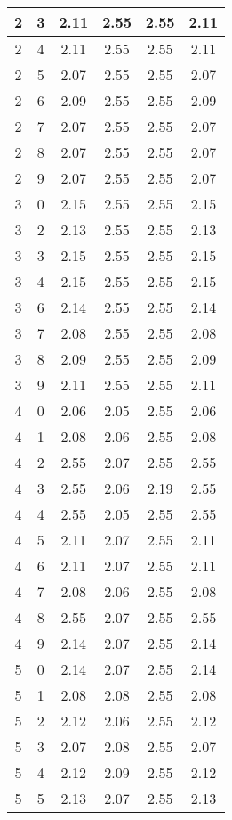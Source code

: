 \begin{longtable}{|c|c||c||c|c||c|}
	2 & 3 & 2.11 & 2.55 & 2.55 & 2.11 \\ \hline
	2 & 4 & 2.11 & 2.55 & 2.55 & 2.11 \\ \hline
	2 & 5 & 2.07 & 2.55 & 2.55 & 2.07 \\ \hline
	2 & 6 & 2.09 & 2.55 & 2.55 & 2.09 \\ \hline
	2 & 7 & 2.07 & 2.55 & 2.55 & 2.07 \\ \hline
	2 & 8 & 2.07 & 2.55 & 2.55 & 2.07 \\ \hline
	2 & 9 & 2.07 & 2.55 & 2.55 & 2.07 \\ \hline
	3 & 0 & 2.15 & 2.55 & 2.55 & 2.15 \\ \hline
	3 & 2 & 2.13 & 2.55 & 2.55 & 2.13 \\ \hline
	3 & 3 & 2.15 & 2.55 & 2.55 & 2.15 \\ \hline
	3 & 4 & 2.15 & 2.55 & 2.55 & 2.15 \\ \hline
	3 & 6 & 2.14 & 2.55 & 2.55 & 2.14 \\ \hline
	3 & 7 & 2.08 & 2.55 & 2.55 & 2.08 \\ \hline
	3 & 8 & 2.09 & 2.55 & 2.55 & 2.09 \\ \hline
	3 & 9 & 2.11 & 2.55 & 2.55 & 2.11 \\ \hline
	4 & 0 & 2.06 & 2.05 & 2.55 & 2.06 \\ \hline
	4 & 1 & 2.08 & 2.06 & 2.55 & 2.08 \\ \hline
	4 & 2 & 2.55 & 2.07 & 2.55 & 2.55 \\ \hline
	4 & 3 & 2.55 & 2.06 & 2.19 & 2.55 \\ \hline
	4 & 4 & 2.55 & 2.05 & 2.55 & 2.55 \\ \hline
	4 & 5 & 2.11 & 2.07 & 2.55 & 2.11 \\ \hline
	4 & 6 & 2.11 & 2.07 & 2.55 & 2.11 \\ \hline
	4 & 7 & 2.08 & 2.06 & 2.55 & 2.08 \\ \hline
	4 & 8 & 2.55 & 2.07 & 2.55 & 2.55 \\ \hline
	4 & 9 & 2.14 & 2.07 & 2.55 & 2.14 \\ \hline
	5 & 0 & 2.14 & 2.07 & 2.55 & 2.14 \\ \hline
	5 & 1 & 2.08 & 2.08 & 2.55 & 2.08 \\ \hline
	5 & 2 & 2.12 & 2.06 & 2.55 & 2.12 \\ \hline
	5 & 3 & 2.07 & 2.08 & 2.55 & 2.07 \\ \hline
	5 & 4 & 2.12 & 2.09 & 2.55 & 2.12 \\ \hline
	5 & 5 & 2.13 & 2.07 & 2.55 & 2.13 \\ \hline

\end{longtable}

